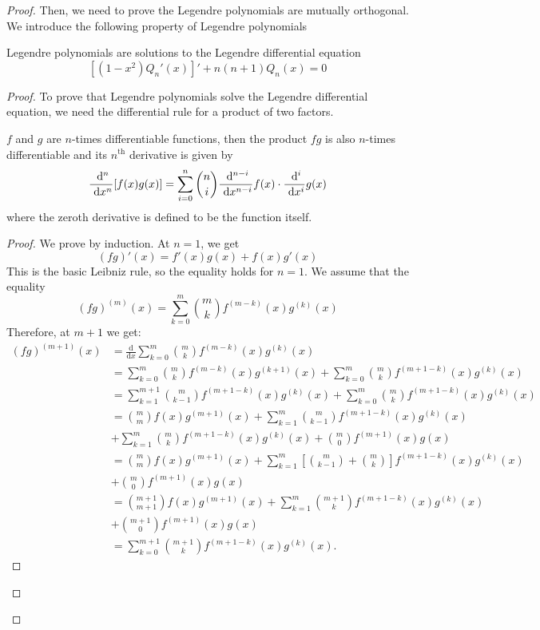 \begin{enumerate}
\begin{proof}
	Then, we need to prove the Legendre polynomials are mutually orthogonal.
	We introduce the following property of Legendre polynomials
	\begin{theorem}
	Legendre polynomials are solutions to the Legendre differential equation
	\[ \left[\left(1-x^2\right)Q_n'(x)\right]'+n(n+1)Q_n(x)=0 \]
	\end{theorem}
	\begin{proof}
	To prove that Legendre polynomials solve the Legendre differential equation, we need the differential rule for a product of two factors.
	\begin{theorem}
	$f$ and $g$ are $n$-times differentiable functions, then the product $fg$ is also $n$-times differentiable and its \(n^\textrm{th}\) derivative is given by
	\[ \frac{~\mathrm{d}^{n}}{~\mathrm{d}{x}^{n}}[f(x)g(x)]=\sum_{i=0}^{n}\binom{n}{i}\frac{~\mathrm{d}^{n-i}}{~\mathrm{d}{x}^{n-i}}f(x)\cdot \frac{~\mathrm{d}^{i}}{~\mathrm{d}{x}^{i}}g(x) \]
	where the zeroth derivative is defined to be the function itself.
	\end{theorem}
	\begin{proof}
	We prove by induction.
	At \(n=1\), we get
	\[ (fg)'(x)=f'(x)g(x)+f(x)g'(x) \]
	This is the basic Leibniz rule, so the equality holds for \(n=1\).
	We assume that the equality
	\[(fg)^{(m)}(x)=\sum_{k=0}^m{\binom{m}{k}}f^{(m-k)}(x)g^{(k)}(x)\]
	Therefore, at $m+1$ we get:
	\begin{align*}
		(fg)^{(m+1)}(x)&=\frac{\text{d}}{\text{d}x}\sum_{k=0}^{m}{\binom{m}{k}}f^{(m-k)}(x)g^{(k)}(x)\\
		&=\sum_{k=0}^{m}{\binom{m}{k}}f^{(m-k)}(x)g^{(k+1)}(x)+\sum_{k=0}^{m}{\binom{m}{k}}f^{(m+1-k)}(x)g^{(k)}(x)\\
		&=\sum_{k=1}^{m+1}{\binom{m}{k-1}}f^{(m+1-k)}(x)g^{(k)}(x)+\sum_{k=0}^{m}{\binom{m}{k}}f^{(m+1-k)}(x)g^{(k)}(x)\\
		&={\binom{m}{m}}f(x)g^{(m+1)}(x)+\sum_{k=1}^{m}{\binom{m}{k-1}}f^{(m+1-k)}(x)g^{(k)}(x)\\
		&+\sum_{k=1}^{m}{\binom{m}{k}}f^{(m+1-k)}(x)g^{(k)}(x)+{\binom{m}{0}}f^{(m+1)}(x)g(x)\\
		&={\binom{m}{m}}f(x)g^{(m+1)}(x)+\sum_{k=1}^{m}\left[{\binom{m}{k-1}}+{\binom{m}{k}}\right]f^{(m+1-k)}(x)g^{(k)}(x)\\
		&+{\binom{m}{0}}f^{(m+1)}(x)g(x)\\
		&={\binom{m+1}{m+1}}f(x)g^{(m+1)}(x)+\sum_{k=1}^m{\binom{m+1}{k}}f^{(m+1-k)}(x)g^{(k)}(x)\\
		&+{\binom{m+1}{0}}f^{(m+1)}(x)g(x)\\
		&=\sum_{k=0}^{m+1}{\binom{m+1}{k}}f^{(m+1-k)}(x)g^{(k)}(x).

\end{align*}
\end{proof}
\end{proof}
\end{proof}
\end{enumerate}

